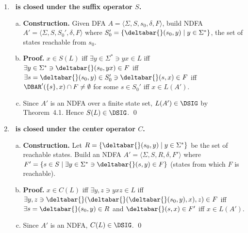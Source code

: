 \begin{enumerate}[{5.}1. ]
\begin{proof}
$x\in P(L)$ iff $\exists y\in\Sigma^*\ni xy\in L$
iff $\exists y\in\Sigma^*\ni\deltabar{}(s_0,xy)\in F$
iff $\exists y\in\Sigma^*\ni\deltabar{}(\deltabar{}(s_0,x),y)\in F$
iff $\deltabar{}(s_0,x)\in F'$
iff $x\in L(A')$.

Since $F'$ is computable (for each state $s$, check if any state in $F$ is reachable from $s$---a finite graph problem), $A'$ is a valid DFA and $P(L)=L(A')\in\DSIG$. \qed
\end{proof}

\item \textbf{\DSIG\ is closed under the suffix operator $S$.}

\begin{enumerate}[(a)]
  \item \textbf{Construction.}  Given DFA $A=\langle\Sigma,S,s_0,\delta,F\rangle$,
  build NDFA $A'=\langle\Sigma,S,S_0',\delta,F\rangle$ where
  $S_0'=\{\deltabar{}(s_0,y)\mid y\in\Sigma^*\}$, the set of states reachable
  from $s_0$.

  \item \textbf{Proof.}  $x\in S(L)$ iff $\exists y\in\Sigma^*\ni yx\in L$
  iff $\exists y\in\Sigma^*\ni\deltabar{}(s_0,yx)\in F$
  iff $\exists s=\deltabar{}(s_0,y)\in S_0'\ni\deltabar{}(s,x)\in F$
  iff $\DBAR'(\{s\},x)\cap F\neq\emptyset$ for some $s\in S_0'$
  iff $x\in L(A')$.

  \item Since $A'$ is an NDFA over a finite state set, $L(A')\in\DSIG$ by Theorem~4.1.  Hence $S(L)\in\DSIG$. \qed
\end{enumerate}

\item \textbf{\DSIG\ is closed under the center operator $C$.}

\begin{enumerate}[(a)]
  \item \textbf{Construction.}  Let
  $R=\{\deltabar{}(s_0,y)\mid y\in\Sigma^*\}$ be the set of reachable states.
  Build an NDFA $A'=\langle\Sigma,S,R,\delta,F'\rangle$ where
  $F'=\{s\in S\mid\exists y\in\Sigma^*\ni\deltabar{}(s,y)\in F\}$ (states from which $F$ is reachable).

  \item \textbf{Proof.}  $x\in C(L)$ iff $\exists y,z\ni yxz\in L$
  iff $\exists y,z\ni\deltabar{}(\deltabar{}(\deltabar{}(s_0,y),x),z)\in F$
  iff $\exists s=\deltabar{}(s_0,y)\in R$ and $\deltabar{}(s,x)\in F'$
  iff $x\in L(A')$.

  \item Since $A'$ is an NDFA, $C(L)\in\DSIG$. \qed
\end{enumerate}


\end{enumerate}
